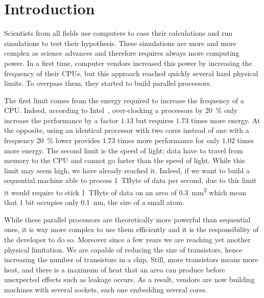 \chapter{Introduction}

Scientists from all fields use computers to ease their calculations and run simulations to test their hypothesis.
These simulations are more and more complex as science advances and therefore requires always more computing power.
In a first time, computer vendors increased this power by increasing the frequency of their \glspl{CPU}, but this approach reached quickly several hard physical limits.
To overpass them, they started to build parallel processors.

The first limit comes from the energy required to increase the frequency of a \gls{CPU}.
Indeed, according to \gls{Intel}~\cite{Ganesan16Introduction}, over-clocking a processors by \SI{20}{\%} only increase the performance by a factor $1.13$ but requires $1.73$ times more energy.
At the opposite, using an identical processor with two cores instead of one with a frequency \SI{20}{\%} lower provides $1.73$ times more performance for only $1.02$ times more energy.
The second limit is the speed of light: data have to travel from memory to the \gls{CPU} and cannot go faster than the speed of light.
While this limit may seem high, we have already reached it.
Indeed, if we want to build a sequential machine able to process \SI{1}{TByte} of data per second, due to this limit it would require  to stick \SI{1}{TByte} of data on an area of \SI{0.3}{mm^2} which mean that $1$ bit occupies only \SI{0.1}{nm}, the size of a small atom.

While these parallel processors are theoretically more powerful than sequential ones, it is way more complex to use them efficiently and it is the responsibility of the developer to do so.
Moreover since a few years we are reaching yet another physical limitation.
We are capable of reducing the size of transistors, hence increasing the number of transistors in a chip.
Still, more transistors means more heat, and there is a maximum of heat that an area can produce before unexpected effects such as leakage occurs.
As a result, vendors are now building machines with several sockets, each one embedding several cores.


